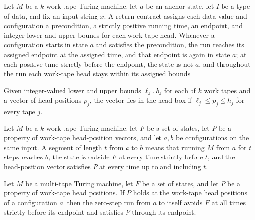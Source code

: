 \begin{definition}
\label{Turing.ReturnContract}
\leanok
{}
Let $M$ be a $k$-work-tape Turing machine, let $a$ be an anchor state, let $I$ be a type
of data, and fix an input string $x$. A return contract assigns each data value and
configuration a precondition, a strictly positive running time, an endpoint, and integer
lower and upper bounds for each work-tape head. Whenever a configuration starts in state
$a$ and satisfies the precondition, the run reaches its assigned endpoint at the
assigned time, and that endpoint is again in state $a$; at each positive time strictly
before the endpoint, the state is not $a$, and throughout the run each work-tape head
stays within its assigned bounds.
\end{definition}

\begin{definition}
\label{Turing.HeadBox}
\leanok
Given integer-valued lower and upper bounds $\ell_j,h_j$ for each of $k$ work tapes and
a vector of head positions $p_j$, the vector lies in the head box if $\ell_j\le p_j\le
h_j$ for every tape $j$.
\end{definition}

\begin{definition}
\label{Turing.Segment}
\leanok
{}
Let $M$ be a $k$-work-tape Turing machine, let $F$ be a set of states, let $P$ be a
property of work-tape head-position vectors, and let $a,b$ be configurations on the same
input. A segment of length $t$ from $a$ to $b$ means that running $M$ from $a$ for $t$
steps reaches $b$, the state is outside $F$ at every time strictly before $t$, and the
head-position vector satisfies $P$ at every time up to and including $t$.
\end{definition}

\begin{theorem}
\label{Turing.Segment.zero}
\leanok
{}
Let $M$ be a multi-tape Turing machine, let $F$ be a set of states, and let $P$ be a
property of work-tape head positions. If $P$ holds at the work-tape head positions of a
configuration $a$, then the zero-step run from $a$ to itself avoids $F$ at all times
strictly before its endpoint and satisfies $P$ through its endpoint.
\end{theorem}

